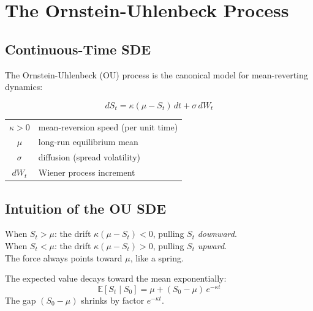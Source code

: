 \documentclass[10pt,a4paper,twocolumn]{article}
\begin{document}
\section{The Ornstein-Uhlenbeck Process}

\subsection{Continuous-Time SDE}

The Ornstein-Uhlenbeck (OU) process is the canonical model for
mean-reverting dynamics:

\begin{tcolorbox}[mathbox={Formula 1 --- OU SDE}]
\vspace{-4pt}
\begin{equation}\label{eq:ou_sde}
  dS_t = \kappa(\mu - S_t)\,dt + \sigma\,dW_t
\end{equation}
\vspace{-4pt}
\begin{center}
\small
\begin{tabular}{@{}cl@{}}
$\kappa>0$ & mean-reversion speed (per unit time)\\
$\mu$ & long-run equilibrium mean\\
$\sigma$ & diffusion (spread volatility)\\
$dW_t$ & Wiener process increment\\
\end{tabular}
\end{center}
\vspace{-2pt}
\end{tcolorbox}

\subsection{Intuition of the OU SDE}

When $S_t > \mu$: the drift $\kappa(\mu - S_t) < 0$, pulling $S_t$
\emph{downward}.\\
When $S_t < \mu$: the drift $\kappa(\mu - S_t) > 0$, pulling $S_t$
\emph{upward}.\\
The force always points toward $\mu$, like a spring.

\begin{tcolorbox}[mathbox={Formula 2 --- Mean Reversion Speed}]
\vspace{-4pt}
The expected value decays toward the mean exponentially:
\begin{equation}
  \mathbb{E}[S_t \mid S_0] = \mu + (S_0 - \mu)\,e^{-\kappa t}
\end{equation}
The gap $(S_0 - \mu)$ shrinks by factor $e^{-\kappa t}$.
\end{tcolorbox}
\end{document}
